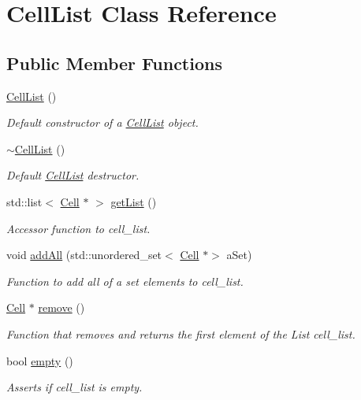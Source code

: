 \hypertarget{class_cell_list}{}\section{Cell\+List Class Reference}
\label{class_cell_list}
\subsection*{Public Member Functions}
\begin{DoxyCompactItemize}
\item 
\hypertarget{class_cell_list_aa5c3ce5f60d54a1222f783b719f7f18d}{}\label{class_cell_list_aa5c3ce5f60d54a1222f783b719f7f18d} 
\hyperlink{class_cell_list_aa5c3ce5f60d54a1222f783b719f7f18d}{Cell\+List} ()
\begin{DoxyCompactList}\small\item\em Default constructor of a \hyperlink{class_cell_list}{Cell\+List} object. \end{DoxyCompactList}\item 
\hypertarget{class_cell_list_a2f7854cd49caefac1f84654ab550e896}{}\label{class_cell_list_a2f7854cd49caefac1f84654ab550e896} 
\hyperlink{class_cell_list_a2f7854cd49caefac1f84654ab550e896}{$\sim$\+Cell\+List} ()
\begin{DoxyCompactList}\small\item\em Default \hyperlink{class_cell_list}{Cell\+List} destructor. \end{DoxyCompactList}\item 
std\+::list$<$ \hyperlink{class_cell}{Cell} $\ast$ $>$ \hyperlink{class_cell_list_aa5fee7de166143e16a0ec1f20349db55}{get\+List} ()
\begin{DoxyCompactList}\small\item\em Accessor function to cell\+\_\+list. \end{DoxyCompactList}\item 
void \hyperlink{class_cell_list_a94857958e9f2156c7b4c76fd774a5fda}{add\+All} (std\+::unordered\+\_\+set$<$ \hyperlink{class_cell}{Cell} $\ast$$>$ a\+Set)
\begin{DoxyCompactList}\small\item\em Function to add all of a set elements to cell\+\_\+list. \end{DoxyCompactList}\item 
\hyperlink{class_cell}{Cell} $\ast$ \hyperlink{class_cell_list_abc7337272382af9d9782628666f9e594}{remove} ()
\begin{DoxyCompactList}\small\item\em Function that removes and returns the first element of the List cell\+\_\+list. \end{DoxyCompactList}\item 
bool \hyperlink{class_cell_list_a5df3e74d57494b51859a6a223f8b2a30}{empty} ()
\begin{DoxyCompactList}\small\item\em Asserts if cell\+\_\+list is empty. \end{DoxyCompactList}\end{DoxyCompactItemize}


